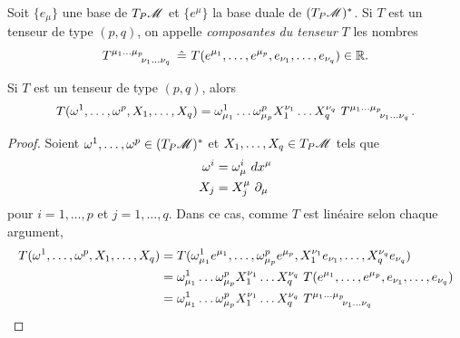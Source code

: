 \documentclass[a4paper,11pt]{report}
\begin{document}
                \begin{defn}
                    Soit $\{e_\mu\}$ une base de $T_P\mathscr{M}$ et $\{e^\mu\}$ la base duale de $(T_P\mathscr{M})^*$. Si $T$ est un tenseur de type $(p,q)$, on appelle \textit{composantes du tenseur} $T$ les nombres
                    \begin{equation}
                        T\indices{^{\mu_1\dots\mu_p}_{\nu_1\dots\nu_q}}~\hat{=}~T(e^{\mu_1},\dots,e^{\mu_p},e_{\nu_1},\dots,e_{\nu_q})\in\mathbb{R}.
                    \end{equation}
                \end{defn}
                
                \begin{prop}\begin{leftbar}
                    Si $T$ est un tenseur de type $(p,q)$, alors
                    \begin{equation}
                        T(\omega^1,\dots,\omega^p,X_1,\dots,X_q) = \omega^1_{\mu_1}\dots\omega^p_{\mu_p}X^{\nu_1}_1\dots X^{\nu_q}_q~ T\indices{^{\mu_1\dots\mu_p}_{\nu_1\dots\nu_q}}.
                    \end{equation}
                \end{leftbar}\end{prop}
                
                \begin{proof}
                    Soient $\omega^1,\dots,\omega^p\in(T_P\mathscr{M})^*$ et $X_1,\dots,X_q\in T_P\mathscr{M}$ tels que 
                    \begin{align}
                        \omega^i &= \omega^i_\mu ~dx^\mu \\
                        X_j &= X^\mu_j~\partial_\mu
                    \end{align}
                    pour $i=1,\dots,p$ et $j=1,\dots,q$. Dans ce cas, comme $T$ est linéaire selon chaque argument,
                    \begin{align}
                        T(\omega^1,\dots,\omega^p,X_1,\dots,X_q) &= T(\omega^1_{\mu_1}e^{\mu_1},\dots,\omega^p_{\mu_p}e^{\mu_p},X^{\nu_1}_1e_{\nu_1},\dots,X^{\nu_q}_qe_{\nu_q}) \\
                        &=\omega^1_{\mu_1}\dots\omega^p_{\mu_p}X^{\nu_1}_1\dots X^{\nu_q}_q~T(e^{\mu_1},\dots,e^{\mu_p},e_{\nu_1},\dots,e_{\nu_q}) \\
                        &= \omega^1_{\mu_1}\dots\omega^p_{\mu_p}X^{\nu_1}_1\dots X^{\nu_q}_q~ T\indices{^{\mu_1\dots\mu_p}_{\nu_1\dots\nu_q}}
                    \end{align}
                \end{proof}
                
\end{document}
